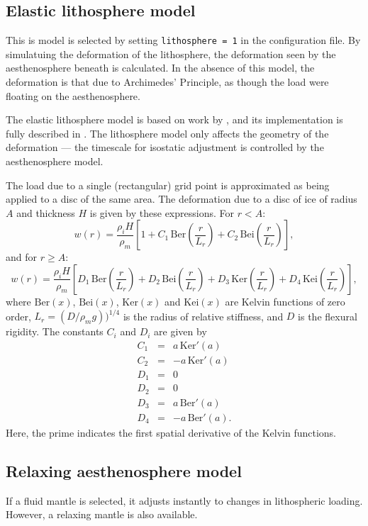 \subsection{Elastic lithosphere model}
This is model is selected by setting \texttt{lithosphere = 1} in the
configuration file. By simulatuing the deformation of the lithosphere, the
deformation seen by the aesthenosphere beneath is calculated. In the absence of this
model, the deformation is that due to Archimedes' Principle, as though the
load were floating on the aesthenosphere.

The elastic lithosphere model is based on work by \cite{Lambeck1980}, and its
implementation is fully described in \cite{Hagdorn2003}. The lithosphere
model only affects the geometry of the deformation --- the timescale for
isostatic adjustment is controlled by the aesthenosphere model. 

The load due to a single (rectangular) grid point is approximated as being
applied to a disc of the same area. The deformation due to a disc of ice of
radius $A$ and thickness $H$ is given by these expressions. For $r<A$:
\begin{equation} 
w(r)=\frac{\rho_i H}{\rho_m}\left[1+C_1\,\mathrm{Ber}\left(\frac{r}{L_r}\right)+C_2\,\mathrm{Bei}\left(\frac{r}{L_r}\right)\right],
\end{equation}
and for $r\geq A$:
\begin{equation}
w(r)=\frac{\rho_i
  H}{\rho_m}\left[D_1\,\mathrm{Ber}\left(\frac{r}{L_r}\right)+D_2\,\mathrm{Bei}\left(\frac{r}{L_r}\right)
+D_3\,\mathrm{Ker}\left(\frac{r}{L_r}\right)+D_4\,\mathrm{Kei}\left(\frac{r}{L_r}\right)\right],
\end{equation}
where $\mathrm{Ber}(x)$, $\mathrm{Bei}(x)$, $\mathrm{Ker}(x)$ and
$\mathrm{Kei}(x)$ are Kelvin functions of zero order, $L_r=(D/\rho_m
g))^{1/4}$ is the radius of relative stiffness, and $D$ is the flexural
rigidity. The constants $C_i$ and $D_i$ are given by
\begin{equation}
\begin{array}{rcl}
C_1&=&a\,\mathrm{Ker}'(a)\\
C_2&=&-a\,\mathrm{Ker}'(a)\\
D_1&=&0\\
D_2&=&0\\
D_3&=&a\,\mathrm{Ber}'(a)\\
D_4&=&-a\,\mathrm{Ber}'(a).
\end{array}
\end{equation}
Here, the prime indicates the first spatial derivative of the Kelvin functions.

\subsection{Relaxing aesthenosphere model}
If a fluid mantle is selected, it adjusts instantly to changes in lithospheric
loading. However, a relaxing mantle is also available.

